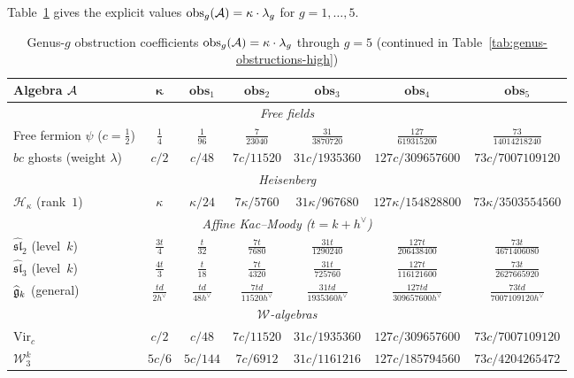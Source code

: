 Table~\ref{tab:genus-obstructions} gives the explicit values
$\operatorname{obs}_g(\mathcal{A}) = \kappa \cdot \lambda_g$ for
$g = 1, \ldots, 5$.

\begin{table}[ht]
\centering
\caption{Genus-$g$ obstruction coefficients $\operatorname{obs}_g(\mathcal{A}) = \kappa \cdot \lambda_g$ through $g = 5$
(continued in Table~\ref{tab:genus-obstructions-high})}
\label{tab:genus-obstructions}
\renewcommand{\arraystretch}{1.5}
{\footnotesize
\begin{tabular}{|l|c|c|c|c|c|c|}
\hline
\textbf{Algebra $\mathcal{A}$}
  & $\boldsymbol{\kappa}$
  & $\mathbf{obs}_{1}$
  & $\mathbf{obs}_{2}$
  & $\mathbf{obs}_{3}$
  & $\mathbf{obs}_{4}$
  & $\mathbf{obs}_{5}$ \\
\hline
\multicolumn{7}{|c|}{\textit{Free fields}} \\
\hline
Free fermion $\psi$ ($c = \tfrac{1}{2}$)
  & $\tfrac{1}{4}$
  & $\tfrac{1}{96}$
  & $\tfrac{7}{23040}$
  & $\tfrac{31}{3870720}$
  & $\tfrac{127}{619315200}$
  & $\tfrac{73}{14014218240}$ \\
\hline
$bc$ ghosts (weight $\lambda$)
  & $c/2$
  & $c/48$
  & $7c/11520$
  & $31c/1935360$
  & $127c/309657600$
  & $73c/7007109120$ \\
\hline
\multicolumn{7}{|c|}{\textit{Heisenberg}} \\
\hline
$\mathcal{H}_\kappa$ (rank~$1$)
  & $\kappa$
  & $\kappa/24$
  & $7\kappa/5760$
  & $31\kappa/967680$
  & $127\kappa/154828800$
  & $73\kappa/3503554560$ \\
\hline
\multicolumn{7}{|c|}{\textit{Affine Kac--Moody ($t = k + h^\vee$)}} \\
\hline
$\widehat{\mathfrak{sl}}_2$ (level~$k$)
  & $\frac{3t}{4}$
  & $\frac{t}{32}$
  & $\frac{7t}{7680}$
  & $\frac{31t}{1290240}$
  & $\frac{127t}{206438400}$
  & $\frac{73t}{4671406080}$ \\[4pt]
\hline
$\widehat{\mathfrak{sl}}_3$ (level~$k$)
  & $\frac{4t}{3}$
  & $\frac{t}{18}$
  & $\frac{7t}{4320}$
  & $\frac{31t}{725760}$
  & $\frac{127t}{116121600}$
  & $\frac{73t}{2627665920}$ \\[4pt]
\hline
$\widehat{\mathfrak{g}}_k$ (general)
  & $\frac{td}{2h^\vee}$
  & $\frac{td}{48 h^\vee}$
  & $\frac{7td}{11520 h^\vee}$
  & $\frac{31td}{1935360 h^\vee}$
  & $\frac{127td}{309657600 h^\vee}$
  & $\frac{73td}{7007109120 h^\vee}$ \\[4pt]
\hline
\multicolumn{7}{|c|}{\textit{$\mathcal{W}$-algebras}} \\
\hline
$\mathrm{Vir}_c$
  & $c/2$
  & $c/48$
  & $7c/11520$
  & $31c/1935360$
  & $127c/309657600$
  & $73c/7007109120$ \\[4pt]
\hline
$\mathcal{W}_3^k$
  & $5c/6$
  & $5c/144$
  & $7c/6912$
  & $31c/1161216$
  & $127c/185794560$
  & $73c/4204265472$ \\[4pt]
\hline
\end{tabular}
}
\end{table}

